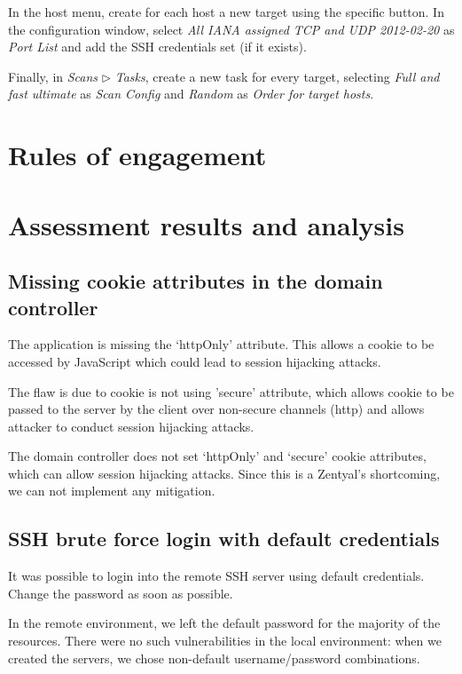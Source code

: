 \documentclass[draft]{homework}
\begin{document}
    In the host menu, create for each host a new target using the specific button.
    In the configuration window, select \textit{All IANA assigned TCP and UDP 2012-02-20} as \textit{Port List} and add the SSH credentials set (if it exists).
    
    Finally, in \textit{Scans} $\triangleright$ \textit{Tasks}, create a new task for every target, selecting \textit{Full and fast ultimate} as \textit{Scan Config} and \textit{Random} as \textit{Order for target hosts}.
    
    
    \section{Rules of engagement}
    
    
    \section{Assessment results and analysis}
    \subsection{Missing cookie attributes in the domain controller}
    \begin{displayquote}
        The application is missing the `httpOnly' attribute.
        \textelp{}
        This allows a cookie to be accessed by JavaScript which could lead to session hijacking attacks.
    \end{displayquote}
    \begin{displayquote}
        The flaw is due to cookie is not using 'secure' attribute, which allows cookie to be passed to the server by the client over non-secure channels (http) and allows attacker to conduct session hijacking attacks.
    \end{displayquote}
    The domain controller does not set `httpOnly' and `secure' cookie attributes, which can allow session hijacking attacks.
    Since this is a Zentyal's shortcoming, we can not implement any mitigation.
    
    \subsection{SSH brute force login with default credentials}
    \begin{displayquote}
        It was possible to login into the remote SSH server using default credentials.
       \textelp{}
       Change the password as soon as possible.
    \end{displayquote}
    In the remote environment, we left the default password for the majority of the resources.
    There were no such vulnerabilities in the local environment: when we created the servers, we chose non-default username/password combinations.
    
\end{document}
